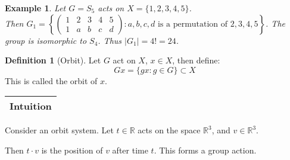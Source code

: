 \documentclass{article}
\theoremstyle{MyNonumberplain}
\theoremstyle{break}
\theoremstyle{break}
\newtheorem{example}{Example}[section]
\theoremstyle{break}
\theoremstyle{definition}
\theoremstyle{break}
\newtheorem{definition}{Definition}[section]
\begin{document}
\begin{expbox}
    \begin{example}
        Let $G = S_5$ acts on $X = \{ 1, 2, 3, 4, 5 \}$.\\

        Then $G_1 = \left\{ \left(\begin{array}{ccccc}
        1 & 2 & 3 & 4 & 5\\
        1 & a & b & c & d
        \end{array}\right) : a, b, c, d \text{ is a permutation of } 2, 3, 4, 5
        \right\}$. The group is isomorphic to $S_4$. Thus $| G_1 | = 4! = 24$.
    \end{example}
\end{expbox}

\begin{defbox}
    \begin{definition}[Orbit]
        Let $G$ act on $X$, $x \in X$, then define:
        \[ G x = \{ g x : g \in G \} \subset X \]
This is called the orbit of $x$.
    \end{definition}
\end{defbox}

\begin{tabular}{|c|}
    \hline
    Intuition\\
    \hline
  \end{tabular}
  
  Consider an orbit system. Let $t \in \mathbb{R}$ acts on the space
  $\mathbb{R}^3$, and $v \in \mathbb{R}^3$.
  
  Then $t \cdot v$ is the position of $v$ after time $t$. This forms a group
  action.
\end{document}
